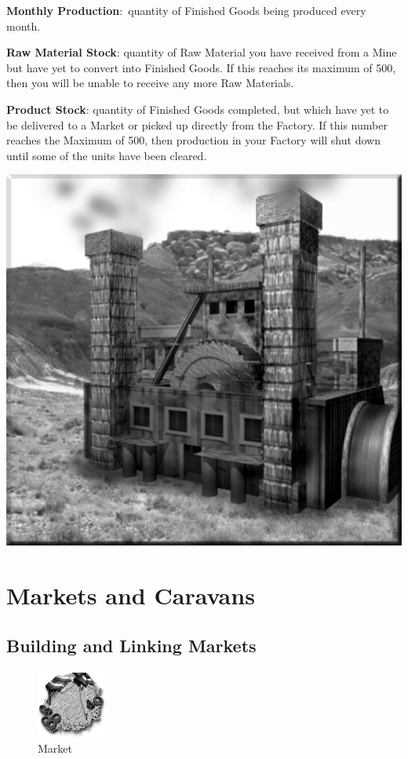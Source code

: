 \textbf{Monthly Production}: quantity of Finished Goods being produced every month.

\textbf{Raw Material Stock}: quantity of Raw Material you have received from a Mine but have yet to convert into Finished Goods. If this reaches its maximum of 500, then you will be unable to receive any more Raw Materials.

\textbf{Product Stock}: quantity of Finished Goods completed, but which have yet to be delivered to a Market or picked up directly from the Factory. If this number reaches the Maximum of 500, then production in your Factory will shut down until some of the units have been cleared.

\begin{center}
	\includegraphics[width=0.9\linewidth]{Afactory}
\end{center}

\section{Markets and Caravans}


\subsection{Building and Linking Markets}


\begin{figure}
	\vspace{-20pt}
	\begin{center}
		\includegraphics[width=0.2\textwidth]{Imarket}
		\\ Market
	\end{center}
	\vspace{-10pt} %
\end{figure}

